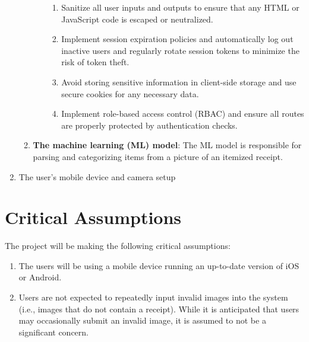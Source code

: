 \documentclass{article}
\begin{document}
\begin{enumerate}
\begin{enumerate}
\begin{itemize}
\begin{enumerate}
					\item Sanitize all user inputs and outputs to ensure that any HTML or JavaScript code is escaped or neutralized.
					\item Implement session expiration policies and automatically log out inactive users and regularly rotate session tokens to minimize the risk of token theft.
					\item Avoid storing sensitive information in client-side storage and use secure cookies for any necessary data.
					\item Implement role-based access control (RBAC) and ensure all routes are properly protected by authentication checks.
				\end{enumerate}
		\end{itemize}
        \item \textbf{The machine learning (ML) model}: The ML model is
        responsible for parsing and categorizing items from a picture of an
        itemized receipt.
    \end{enumerate}
    \item The user’s mobile device and camera setup
\end{enumerate}


\section{Critical Assumptions}

The project will be making the following critical assumptions: 
\begin{enumerate}
    \item The users will be
    using a mobile device running an up-to-date version of iOS or Android.
    \item Users are
    not expected to repeatedly input invalid images into the system (i.e., images
    that do not contain a receipt). While it is anticipated that users may
    occasionally submit an invalid image, it is assumed to not be a significant
    concern.
\end{enumerate}  
\end{document}
